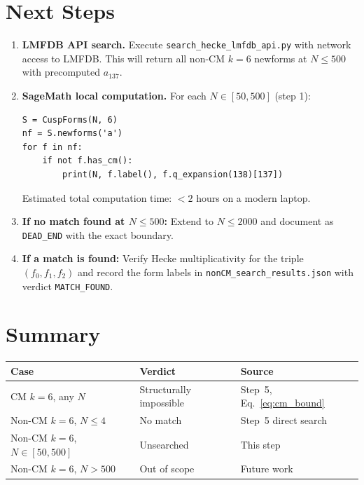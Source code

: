 \documentclass[12pt,a4paper]{article}
\theoremstyle{definition}
\theoremstyle{remark}
\begin{document}
\section{Next Steps}
\label{sec:next}

\begin{enumerate}
  \item \textbf{LMFDB API search.}  Execute
    \texttt{search\_hecke\_lmfdb\_api.py} with network access to LMFDB.
    This will return all non-CM $k=6$ newforms at $N \le 500$ with
    precomputed $a_{137}$.

  \item \textbf{SageMath local computation.}
    For each $N \in [50, 500]$ (step 1):
    \begin{lstlisting}
S = CuspForms(N, 6)
nf = S.newforms('a')
for f in nf:
    if not f.has_cm():
        print(N, f.label(), f.q_expansion(138)[137])
    \end{lstlisting}
    Estimated total computation time: $<2$ hours on a modern laptop.

  \item \textbf{If no match found at $N \le 500$:}  Extend to $N \le 2000$
    and document as \texttt{DEAD\_END} with the exact boundary.

  \item \textbf{If a match is found:}  Verify Hecke multiplicativity
    for the triple $(f_0, f_1, f_2)$ and record the form labels in
    \texttt{nonCM\_search\_results.json} with verdict \texttt{MATCH\_FOUND}.
\end{enumerate}

\section{Summary}
\label{sec:summary}

\begin{center}
\begin{tabular}{lll}
  \toprule
  \textbf{Case} & \textbf{Verdict} & \textbf{Source} \\
  \midrule
  CM $k=6$, any $N$ & \textcolor{failred}{Structurally impossible} & Step~5, Eq.~\eqref{eq:cm_bound} \\
  Non-CM $k=6$, $N \le 4$ & \textcolor{failred}{No match} & Step~5 direct search \\
  Non-CM $k=6$, $N \in [50,500]$ & \textcolor{warnblue}{Unsearched} & This step \\
  Non-CM $k=6$, $N > 500$ & \textcolor{warnblue}{Out of scope} & Future work \\
  \bottomrule
\end{tabular}
\end{center}
\end{document}

